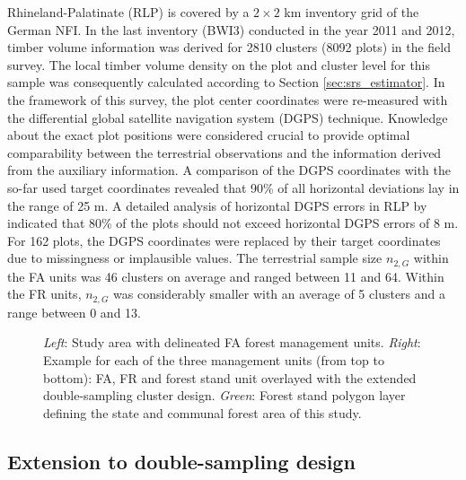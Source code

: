 Rhineland-Palatinate (RLP) is covered by a $2 \times 2$ km inventory grid of the German NFI. In the last inventory (BWI3) conducted in the year 2011 and 2012, timber volume information was derived for 2810 clusters (8092 plots) in the field survey. The local timber volume density on the plot and cluster level for this sample was consequently calculated according to Section \ref{sec:srs_estimator}. In the framework of this survey, the plot center coordinates were re-measured with the differential global satellite navigation system (DGPS) technique. Knowledge about the exact plot positions were considered crucial to provide optimal comparability between the terrestrial observations and the information derived from the auxiliary information. A comparison of the DGPS coordinates with the so-far used target coordinates revealed that 90\% of all horizontal deviations lay in the range of 25 m. A detailed analysis of horizontal DGPS errors in RLP by \citet{lambrecht2017} indicated that 80\% of the plots should not exceed horizontal DGPS errors of 8 m. For 162 plots, the DGPS coordinates were replaced by their target coordinates due to missingness or implausible values. The terrestrial sample size $n_{2,G}$ within the FA units was 46 clusters on average and ranged between 11 and 64. Within the FR units, $n_{2,G}$ was considerably smaller with an average of 5 clusters and a range between 0 and 13.

\begin{figure}[H]
	\centering
	\caption{\textit{Left}: Study area with delineated FA forest management units. \textit{Right}: Example for each of the three management units (from top to bottom): FA, FR and forest stand unit overlayed with the extended double-sampling cluster design. \textit{Green}: Forest stand polygon layer defining the state and communal forest area of this study.}
	\label{fig:StudyArean}
\end{figure}

\subsection{Extension to double-sampling design}
\label{ext_to_2phase}

